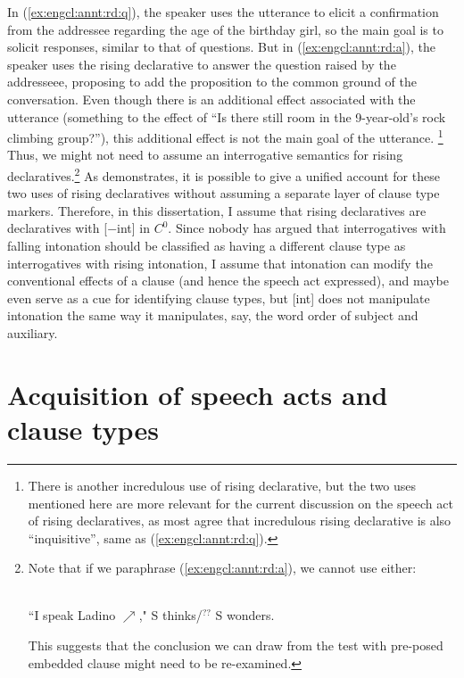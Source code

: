In (\ref{ex:engcl:annt:rd:q}), the speaker uses the utterance to elicit a confirmation from the addressee regarding the age of the birthday girl, so the main goal is to solicit responses, similar to that of questions. But in (\ref{ex:engcl:annt:rd:a}), the speaker uses the rising declarative to answer the question raised by the addresseee, proposing to add the proposition  to the common ground of the conversation. Even though there is an additional effect associated with the utterance (something to the effect of ``Is there still room in the 9-year-old’s rock climbing group?''), this additional effect is not the main goal of the utterance. \footnote{There is another incredulous use of rising declarative, but the two uses mentioned here are more relevant for the current discussion on the speech act of rising declaratives, as most agree that incredulous rising declarative is also ``inquisitive'', same as (\ref{ex:engcl:annt:rd:q}).} Thus, we might not need to assume an interrogative semantics for rising declaratives.\footnote{Note that if we paraphrase (\ref{ex:engcl:annt:rd:a}), we cannot use  either:

\\
``I speak Ladino $\nearrow$," S thinks/$^{??}$ S wonders.
\eex
 
This suggests that the conclusion we can draw from the test with pre-posed embedded clause might need to be re-examined.}  As \textcite{goodhue2021rd} demonstrates, it is possible to give a unified account for these two uses of rising declaratives without assuming a separate layer of clause type markers. Therefore, in this dissertation, I assume that rising declaratives are declaratives with [$-$int] in $C^{0}$. Since nobody has argued that interrogatives with falling intonation should be classified as having a different clause type as interrogatives with rising intonation, I assume that intonation can modify the conventional effects of a clause (and hence the speech act expressed), and maybe even serve as a cue for identifying clause types, but [\textpm int] does not manipulate intonation the same way it manipulates, say, the word order of subject and auxiliary.


\section{Acquisition of speech acts and clause types}
\label{sec:bg:acq}
